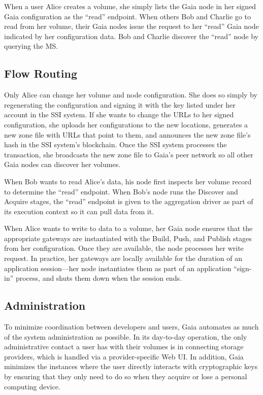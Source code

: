 When a user Alice creates a volume, she simply lists the Gaia node
in her signed Gaia configuration as the ``read'' endpoint.  When others Bob and Charlie go to
read from her volume, their Gaia nodes issue the request to her ``read'' Gaia node
indicated by her configuration data.  Bob and Charlie discover the ``read'' node 
by querying the MS.

\subsection{Flow Routing}

Only Alice can change her volume and node configuration.  She does so simply by
regenerating the configuration and signing it with the key listed under her
account in the SSI system.  If she wants to change the URLs to her signed
configuration, she uploads her configurations to the new locations, generates a
new zone file with URLs that point to them, and announces the new zone file's
hash in the SSI system's blockchain.  Once the SSI system processes the
transaction, she broadcasts the new zone file to Gaia's peer network so all
other Gaia nodes can discover her volumes.

When Bob wants to read Alice's data, his node first inspects her volume record
to determine the ``read'' endpoint.  When Bob's node runs the Discover and
Acquire stages, the ``read'' endpoint is given to the aggregation driver as part
of its execution context so it can pull data from it.

When Alice wants to write to data to a volume, her Gaia node ensures that the
appropriate gateways are instantiated with the Build, Push, and Publish stages
from her configuration.  Once they are available, the node processes her write
request.  In practice, her gateways are locally available for the duration of an
application session---her node instantiates them as part of an application
``sign-in'' process, and shuts them down when the session ends.

\subsection{Administration}

To minimize coordination between developers and users, Gaia
automates as much of the system administration as possible.
In its day-to-day operation, the only administrative contact a user has with their volumes is
in connecting storage providers, which is handled via a provider-specific Web
UI.  In addition, Gaia minimizes the instances where the user directly interacts with cryptographic keys
by ensuring that they only need to do so when they acquire or lose a personal
computing device.

